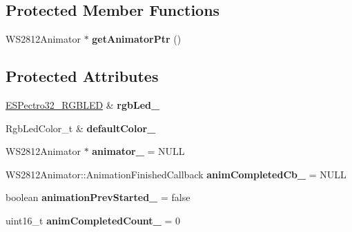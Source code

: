 \subsection*{Protected Member Functions}
\begin{DoxyCompactItemize}
\item 
\hypertarget{classESPectro32__RGBLED__Animation_a74b6ded71ed63e49f4c865258b5516ca}{W\-S2812\-Animator $\ast$ {\bfseries get\-Animator\-Ptr} ()}\label{classESPectro32__RGBLED__Animation_a74b6ded71ed63e49f4c865258b5516ca}

\end{DoxyCompactItemize}
\subsection*{Protected Attributes}
\begin{DoxyCompactItemize}
\item 
\hypertarget{classESPectro32__RGBLED__Animation_af280cb124d7a2ee7fa157625e49b816c}{\hyperlink{classESPectro32__RGBLED}{E\-S\-Pectro32\-\_\-\-R\-G\-B\-L\-E\-D} \& {\bfseries rgb\-Led\-\_\-}}\label{classESPectro32__RGBLED__Animation_af280cb124d7a2ee7fa157625e49b816c}

\item 
\hypertarget{classESPectro32__RGBLED__Animation_a89e7efa0cf8ca9c3353e2049e4316d39}{Rgb\-Led\-Color\-\_\-t \& {\bfseries default\-Color\-\_\-}}\label{classESPectro32__RGBLED__Animation_a89e7efa0cf8ca9c3353e2049e4316d39}

\item 
\hypertarget{classESPectro32__RGBLED__Animation_a33676837678e6e90c3eda53ba247d2e1}{W\-S2812\-Animator $\ast$ {\bfseries animator\-\_\-} = N\-U\-L\-L}\label{classESPectro32__RGBLED__Animation_a33676837678e6e90c3eda53ba247d2e1}

\item 
\hypertarget{classESPectro32__RGBLED__Animation_a442a1b2856cd5ac5b5f6081374aaea1e}{W\-S2812\-Animator\-::\-Animation\-Finished\-Callback {\bfseries anim\-Completed\-Cb\-\_\-} = N\-U\-L\-L}\label{classESPectro32__RGBLED__Animation_a442a1b2856cd5ac5b5f6081374aaea1e}

\item 
\hypertarget{classESPectro32__RGBLED__Animation_a5d33f43d0e6c27e9bc7f58171bde970b}{boolean {\bfseries animation\-Prev\-Started\-\_\-} = false}\label{classESPectro32__RGBLED__Animation_a5d33f43d0e6c27e9bc7f58171bde970b}

\item 
\hypertarget{classESPectro32__RGBLED__Animation_ae4c68e9d7db1fd7fe3c75b7502cb1cf2}{uint16\-\_\-t {\bfseries anim\-Completed\-Count\-\_\-} = 0}\label{classESPectro32__RGBLED__Animation_ae4c68e9d7db1fd7fe3c75b7502cb1cf2}


\end{DoxyCompactItemize}
